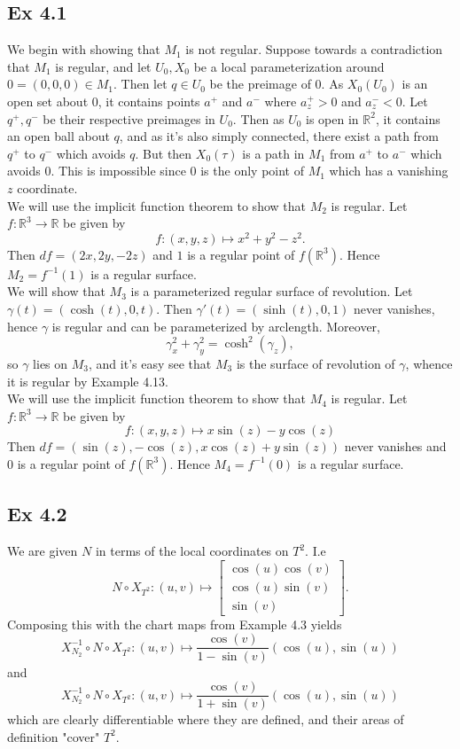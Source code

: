 \documentclass{article}
\theoremstyle{definition}
\newcommand{\R}{\mathbb{R}}
\begin{document}
\subsection*{Ex 4.1}

We begin with showing that $M_1$ is not regular. Suppose towards a
contradiction that $M_1$ is regular, and let $U_{0}, X_{0}$ be a local
parameterization around $0 = (0, 0, 0) \in M_1$. Then let $q \in U_0$ be the
preimage of $0$. As $X_0(U_0)$ is an open set about $0$, it contains points
$a^{+}$ and $a^{-}$ where $a^{+}_z > 0$ and $a^{-}_z < 0$. Let $q^{+}, q^{-}$
be their respective preimages in $U_0$. Then as $U_0$ is open in $\R^2$, it
contains an open ball about $q$, and as it's also simply connected, there exist
a path from $q^{+}$ to $q^{-}$ which avoids $q$. But then $X_0(\tau)$ is a path
in $M_1$ from $a^{+}$ to $a^{-}$ which avoids $0$. This is impossible since $0$
is the only point of $M_1$ which has a vanishing $z$ coordinate. \\


We will use the implicit function theorem to show that $M_2$ is regular. Let $f
: \R^{3} \to \R$ be given by 
\[
	f : (x, y, z) \mapsto x^2 + y^2 - z^2.
\] 
Then $df = (2x, 2y, -2z)$ and $1$ is a regular point of $f(\R^{3})$. Hence $M_2
= f^{-1}(1)$ is a regular surface. \\

We will show that $M_3$ is a parameterized regular surface of revolution. Let
$\gamma(t) = (\cosh(t), 0, t)$. Then $\gamma'(t) = (\sinh(t), 0, 1)$ never vanishes,
hence $\gamma$ is regular and can be parameterized by arclength. Moreover, 
\[
	\gamma_x^2 + \gamma_y^{2} = \cosh^2(\gamma_{z}),
\] 
so $\gamma$ lies on $M_3$, and it's easy see that $M_3$ is the surface of
revolution of $\gamma$, whence it is regular by Example 4.13. \\

We will use the implicit function theorem to show that $M_4$ is regular. Let $f
: \R^{3} \to \R$ be given by 
\[
	f : (x, y, z) \mapsto x \sin(z) - y \cos(z)
\] 
Then $df = (\sin(z), -\cos(z), x \cos(z) + y \sin(z))$ never vanishes and $0$ is
a regular point of $f(\R^{3})$. Hence $M_4 = f^{-1}(0)$ is a regular surface.
\\

\subsection*{Ex 4.2}

We are given $N$ in terms of the local coordinates on $T^2$. I.e
\[
	N \circ X_{T^2}
	:
	(u, v)
	\mapsto
	\begin{bmatrix}
		\cos(u)\cos(v) \\
		\cos(u)\sin(v) \\
		\sin(v)
	\end{bmatrix}.
\]
Composing this with the chart maps
from Example 4.3 yields
\[
	X_{N_2}^{-1} \circ N \circ X_{T^2}
	:
	(u, v)
	\mapsto
	\frac{\cos(v)}{1 - \sin(v)}
	(\cos(u), \sin(u))
\]
and
\[
	X_{N_2}^{-1} \circ N \circ X_{T^2}
	:
	(u, v)
	\mapsto
	\frac{\cos(v)}{1 + \sin(v)}
	(\cos(u), \sin(u))
\]
which are clearly differentiable where they are defined, and their areas of
definition "cover" $T^2$.
\end{document}
